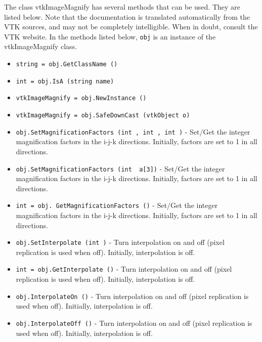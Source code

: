 The class vtkImageMagnify has several methods that can be used.
  They are listed below.
Note that the documentation is translated automatically from the VTK sources,
and may not be completely intelligible.  When in doubt, consult the VTK website.
In the methods listed below, \verb|obj| is an instance of the vtkImageMagnify class.
\begin{itemize}
\item  \verb|string = obj.GetClassName ()|

\item  \verb|int = obj.IsA (string name)|

\item  \verb|vtkImageMagnify = obj.NewInstance ()|

\item  \verb|vtkImageMagnify = obj.SafeDownCast (vtkObject o)|

\item  \verb|obj.SetMagnificationFactors (int , int , int )| -  Set/Get the integer magnification factors in the i-j-k directions.
 Initially, factors are set to 1 in all directions.

\item  \verb|obj.SetMagnificationFactors (int  a[3])| -  Set/Get the integer magnification factors in the i-j-k directions.
 Initially, factors are set to 1 in all directions.

\item  \verb|int = obj. GetMagnificationFactors ()| -  Set/Get the integer magnification factors in the i-j-k directions.
 Initially, factors are set to 1 in all directions.

\item  \verb|obj.SetInterpolate (int )| -  Turn interpolation on and off (pixel replication is used when off).
 Initially, interpolation is off.

\item  \verb|int = obj.GetInterpolate ()| -  Turn interpolation on and off (pixel replication is used when off).
 Initially, interpolation is off.

\item  \verb|obj.InterpolateOn ()| -  Turn interpolation on and off (pixel replication is used when off).
 Initially, interpolation is off.

\item  \verb|obj.InterpolateOff ()| -  Turn interpolation on and off (pixel replication is used when off).
 Initially, interpolation is off.

\end{itemize}
